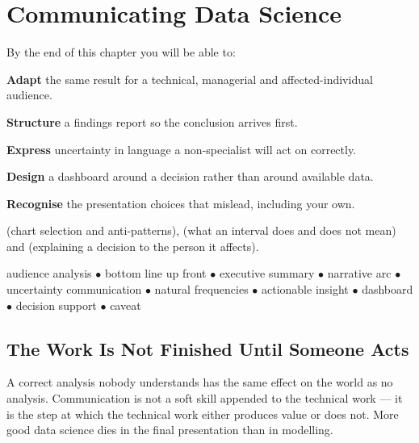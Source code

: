 \chapter{Communicating Data Science}\label{ch:communication}

\begin{outcomes}
By the end of this chapter you will be able to:
\begin{tight}
  \item \textbf{Adapt} the same result for a technical, managerial and affected-individual audience.
  \item \textbf{Structure} a findings report so the conclusion arrives first.
  \item \textbf{Express} uncertainty in language a non-specialist will act on correctly.
  \item \textbf{Design} a dashboard around a decision rather than around available data.
  \item \textbf{Recognise} the presentation choices that mislead, including your own.
\end{tight}
\end{outcomes}

\begin{prereq}
 (chart selection and anti-patterns),  (what an interval
does and does not mean) and  (explaining a decision to the person it
affects).
\end{prereq}

\begin{keyterms}
audience analysis $\bullet$ bottom line up front $\bullet$ executive summary
$\bullet$ narrative arc $\bullet$ uncertainty communication $\bullet$ natural
frequencies $\bullet$ actionable insight $\bullet$ dashboard $\bullet$ decision
support $\bullet$ caveat
\end{keyterms}

\section{The Work Is Not Finished Until Someone Acts}

\begin{conceptbox}
A correct analysis nobody understands has the same effect on the world as no
analysis. Communication is not a soft skill appended to the technical work --- it is
the step at which the technical work either produces value or does not. More good
data science dies in the final presentation than in modelling.
\end{conceptbox}

